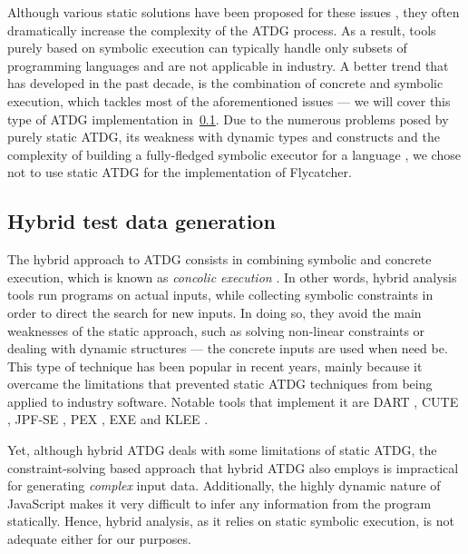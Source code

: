 Although various static solutions have been proposed for these issues \cite{ramamoorthy1976automated,goldberg1994applications,offutt1999dynamic}, they often dramatically increase the complexity of the ATDG process. As a result, tools purely based on symbolic execution can typically handle only subsets of programming languages and are not applicable in industry. A better trend that has developed in the past decade, is the combination of concrete and symbolic execution, which tackles most of the aforementioned issues \cite{păsăreanu2009survey} --- we will cover this type of ATDG implementation in~\ref{subsec:hybrid_atdg}. Due to the numerous problems posed by purely static ATDG, its weakness with dynamic types and constructs \cite{edvardsson1999survey,tahbildar2automated} and the complexity of building a fully-fledged symbolic executor for a language \cite{edvardsson1999survey,han2008empirical}, we chose not to use static ATDG for the implementation of \textsf{Flycatcher}.

\subsection{Hybrid test data generation}
\label{subsec:hybrid_atdg}

The hybrid approach to ATDG consists in combining symbolic and concrete execution, which is known as \emph{concolic execution} \cite{păsăreanu2009survey}. In other words, hybrid analysis tools run programs on actual inputs, while collecting symbolic constraints in order to direct the search for new inputs. In doing so, they avoid the main weaknesses of the static approach, such as solving non-linear constraints or dealing with dynamic structures --- the concrete inputs are used when need be. This type of technique has been popular in recent years, mainly because it overcame the limitations that prevented static ATDG techniques from being applied to industry software. Notable tools that implement it are DART \cite{godefroid2005dart}, CUTE \cite{sen2005cute}, JPF-SE \cite{anand2007jpf}, PEX \cite{tillmann2008pex}, EXE \cite{cadar2008exe} and KLEE \cite{cadar2008klee}.

Yet, although hybrid ATDG deals with some limitations of static ATDG, the constraint-solving based approach that hybrid ATDG also employs is impractical for generating \emph{complex} input data. Additionally, the highly dynamic nature of JavaScript makes it very difficult to infer any information from the program statically. Hence, hybrid analysis, as it relies on static symbolic execution, is not adequate either for our purposes.

